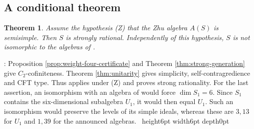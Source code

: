 \documentclass[leqno]{article}
\newcommand{\qed}{\hfill \vrule height6pt  width6pt depth0pt}
\newtheorem{thm}{Theorem}[section]
\newenvironment{proof}[1][]{\noindent {\it Proof #1} : }{\hbox{~}\qed
\smallskip
}
\numberwithin{equation}{section}
\begin{document}
\subsection{A conditional theorem}
\label{subsec:conditional}

\begin{thm}
\label{thm:conditional}
Assume the hypothesis \textup{(Z)} that the Zhu algebra $A(S)$ is semisimple. Then $S$ is strongly rational. Independently of this hypothesis, $S$ is not isomorphic to the algebras of \cite{Rie26,Hua26}.
\end{thm}

\begin{proof}
Proposition \ref{prop:weight-four-certificate} and Theorem \ref{thm:strong-generation} give $C_2$-cofiniteness. Theorem \ref{thm:unitarity} gives simplicity, self-contragredience and CFT type. Thus \cite[Main Theorem 3 (Corollary 5.19)]{McR21} applies under \textup{(Z)} and proves strong rationality. For the last assertion, an isomorphism with an algebra of \cite{Rie26,Hua26} would force $\dim S_1 = 6$. Since $S_1$ contains the six-dimensional subalgebra $U_1$, it would then equal $U_1$. Such an isomorphism would preserve the levels of its simple ideals, whereas these are $3,13$ for $U_1$ and $1,39$ for the announced algebras.
\end{proof}
\end{document}
